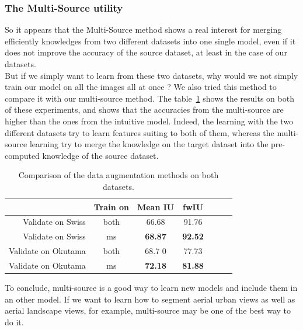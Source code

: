 \subsubsection{The Multi-Source utility}
So it appears that the Multi-Source method shows a real interest for merging efficiently knowledges from two different datasets into one single model, even if it does not improve the accuracy of the source dataset, at least in the case of our datasets. \\
But if we simply want to learn from these two datasets, why would we not simply train our model on all the images all at once ? We also tried this method to compare it with our multi-source method. The table~\ref{fig:part4:setup4} shows the results on both of these experiments, and shows that the accuracies from the multi-source are higher than the ones from the intuitive model. Indeed, the learning with the two different datasets try to learn features suiting to both of them, whereas the multi-source learning try to merge the knowledge on the target dataset into the pre-computed knowledge of the source dataset.

\begin{table}[htbp]
  \centering
  
  \begin{tabular}{rcccccc}
  \rowcolor{gray!50}
  \toprule
   & \textbf{Train on} & \textbf{Mean IU} & \textbf{fwIU} \\
  \midrule
  Validate on Swiss & both	&		66.68			&	91.76 \\
  Validate on Swiss & ms		&		\textbf{68.87}	&	\textbf{92.52} \\
  \midrule
  Validate on Okutama & both &		68.7	0			&	77.73 \\
  Validate on Okutama & ms   &		\textbf{72.18}	&	\textbf{81.88} \\
  \bottomrule
  \end{tabular}%
  
  \caption{Comparison of the data augmentation methods on both datasets.}
  \label{fig:part4:setup4}
\end{table}%

To conclude, multi-source is a good way to learn new models and include them in an other model. If we want to learn how to segment aerial urban views as well as aerial landscape views, for example, multi-source may be one of the best way to do it.


